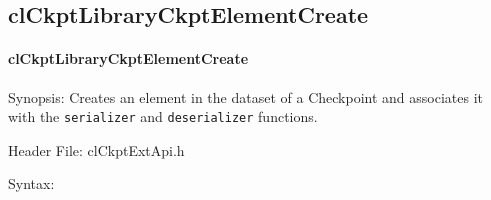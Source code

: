 \begin{flushleft}
\subsection{clCkptLibraryCkptElementCreate}
\hypertarget{pageckpt211}{}\paragraph{cl\-Ckpt\-Library\-Ckpt\-Element\-Create}\label{pageckpt211}
\begin{Desc}
\item[Synopsis:]Creates an element in the dataset of a Checkpoint and associates it with the {\tt{serializer}} and {\tt{deserializer}} functions.\end{Desc}
\begin{Desc}
\item[Header File:]clCkptExtApi.h\end{Desc}
\begin{Desc}
\item[Syntax:]


\end{Desc}
\end{flushleft}
